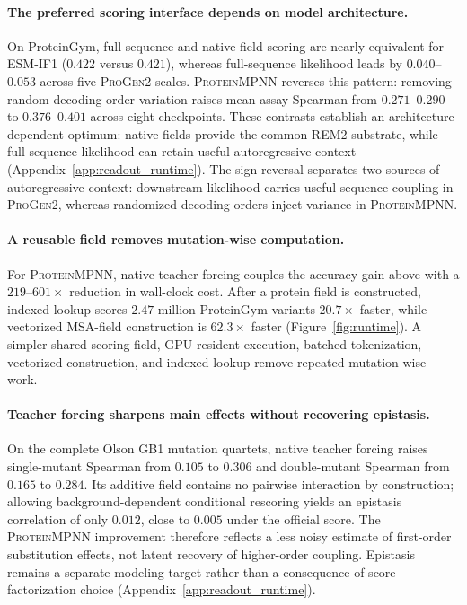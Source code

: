 \documentclass{article} %
\begin{document}
\paragraph{The preferred scoring interface depends on model architecture.}
On ProteinGym, full-sequence and native-field scoring are nearly equivalent for \textsc{ESM-IF1} ($0.422$ versus $0.421$), whereas full-sequence likelihood leads by $0.040$--$0.053$ across five \textsc{ProGen2} scales. \textsc{ProteinMPNN} reverses this pattern: removing random decoding-order variation raises mean assay Spearman from $0.271$--$0.290$ to $0.376$--$0.401$ across eight checkpoints. These contrasts establish an architecture-dependent optimum: native fields provide the common \textsc{REM2} substrate, while full-sequence likelihood can retain useful autoregressive context (Appendix~\ref{app:readout_runtime}). The sign reversal separates two sources of autoregressive context: downstream likelihood carries useful sequence coupling in \textsc{ProGen2}, whereas randomized decoding orders inject variance in \textsc{ProteinMPNN}.

\paragraph{A reusable field removes mutation-wise computation.}
For \textsc{ProteinMPNN}, native teacher forcing couples the accuracy gain above with a $219$--$601\times$ reduction in wall-clock cost. After a protein field is constructed, indexed lookup scores $2.47$ million ProteinGym variants $20.7\times$ faster, while vectorized MSA-field construction is $62.3\times$ faster (Figure~\ref{fig:runtime}). A simpler shared scoring field, GPU-resident execution, batched tokenization, vectorized construction, and indexed lookup remove repeated mutation-wise work.

\paragraph{Teacher forcing sharpens main effects without recovering epistasis.}
On the complete Olson GB1 mutation quartets, native teacher forcing raises single-mutant Spearman from $0.105$ to $0.306$ and double-mutant Spearman from $0.165$ to $0.284$. Its additive field contains no pairwise interaction by construction; allowing background-dependent conditional rescoring yields an epistasis correlation of only $0.012$, close to $0.005$ under the official score. The \textsc{ProteinMPNN} improvement therefore reflects a less noisy estimate of first-order substitution effects, not latent recovery of higher-order coupling. Epistasis remains a separate modeling target rather than a consequence of score-factorization choice (Appendix~\ref{app:readout_runtime}).
\end{document}
